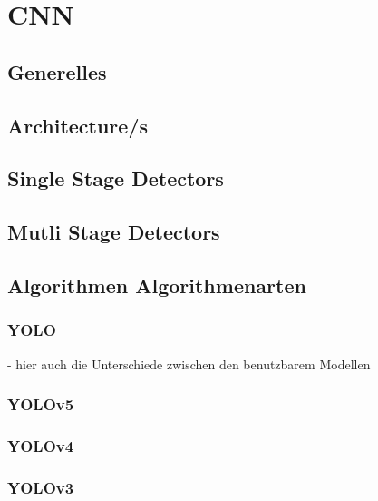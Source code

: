 
\chapter{CNN}
\label{sec:cnn}

\section{Generelles}

\section{Architecture/s}

\section{Single Stage Detectors}

\section{Mutli Stage Detectors}

\section{Algorithmen Algorithmenarten}

\subsection{YOLO}
- hier auch die Unterschiede zwischen den benutzbarem Modellen
\subsection{YOLOv5}

\subsection{YOLOv4}

\subsection{YOLOv3}